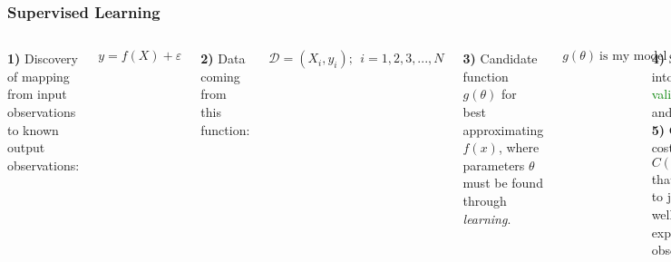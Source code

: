 \documentclass[11pt]{beamer}
\newcommand{\citat}[2]{\textbf{\textcolor{blue}{#1 et al. (#2)}}}
\begin{document}
\begin{frame}
  \frametitle{\normalsize{\textbf{
       Supervised Learning
  }}} 

  \scriptsize{

    \begin{columns}
      
      \textbf{1)} Discovery of mapping from input observations to known output
      observations: 

      $$y = f(X) + \varepsilon $$

      \textbf{2)} Data coming from this function:

      $$\mathcal{D} = (X_i, y_i); \: \: i=1, 2, 3, ..., N$$

      \textbf{3)} Candidate function $g(\theta)$ for best approximating $f(x)$,
      where parameters $\theta$ must be found through \emph{learning}.

      $$
      g(\theta) \: \text{is my model}
      $$

      \textbf{4)} Split data into \textcolor{red}{train},
      \textcolor{green}{validation}, and \textcolor{blue}{test}. \\[0.075cm]

      \textbf{5)} Choose a cost function $C(\mathcal{D}, g(\theta))$ that
      allows us to judge how well the model explains the observations. \\

      
      \textbf{6)} The model is fit by finding the values of $\theta$ that
      minimizes the cost function on \textcolor{red}{train} data. \\[0.01cm]

      \textbf{7)} Search for \textbf{hyperparameters} using
      \textcolor{green}{validation} data. \\[0.01cm]

      \textbf{8)} Final evaluation of \textbf{model} using
      \textcolor{blue}{test} data.
      
      \begin{figure}[h!]
        \centering
        \texttt{[image: schematic.png]} 
        \caption*{\scriptsize{
            \citat{Mehta}{2019}
        }}
    \end{figure}
    
    \end{columns}
    
  }
    
\end{frame}
\end{document}
